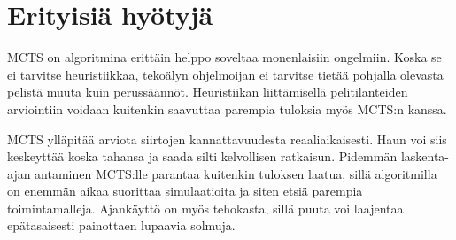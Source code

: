 \documentclass[12pt,finnish]{tktltiki2}
\theoremstyle{definition}
\theoremstyle{remark}
\begin{document}
\section{Erityisiä hyötyjä}

MCTS on algoritmina erittäin helppo soveltaa monenlaisiin ongelmiin. Koska se ei tarvitse heuristiikkaa, tekoälyn ohjelmoijan ei tarvitse tietää pohjalla olevasta pelistä muuta kuin perussäännöt. Heuristiikan liittämisellä pelitilanteiden arviointiin voidaan kuitenkin saavuttaa parempia tuloksia myös MCTS:n kanssa.~\cite{browne}

MCTS ylläpitää arviota siirtojen kannattavuudesta reaaliaikaisesti. Haun voi siis keskeyttää koska tahansa ja saada silti kelvollisen ratkaisun. Pidemmän laskenta-ajan antaminen MCTS:lle parantaa kuitenkin tuloksen laatua, sillä algoritmilla on enemmän aikaa suorittaa simulaatioita ja siten etsiä parempia toimintamalleja. Ajankäyttö on myös tehokasta, sillä puuta voi laajentaa epätasaisesti painottaen lupaavia solmuja. ~\cite{browne}


%
%
% 
%







% 
\end{document}
